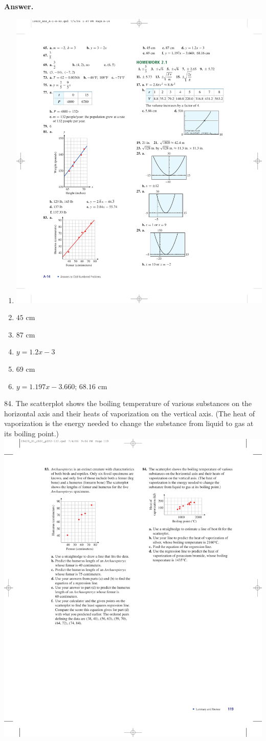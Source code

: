 \documentclass[10pt,]{book}
\theoremstyle{plain}
\theoremstyle{definition}
\theoremstyle{definition}
\theoremstyle{definition}
\theoremstyle{definition}
\numberwithin{equation}{part}
\begin{document}
\begin{exerciselist}
\noindent\textbf{Answer.}\hypertarget{answer-264}{}\quad
\leavevmode%
\begin{multicols}{2}
\begin{enumerate}[label=*\alph**]
\item\hypertarget{li-1686}{}\includegraphics[width=0.8\linewidth]{images/fig-ans-chap1-rev-83}
%
\item\hypertarget{li-1687}{}\(45\) cm%
\item\hypertarget{li-1688}{}\(87\) cm%
\item\hypertarget{li-1689}{}\(y = 1.2x - 3\)%
\item\hypertarget{li-1690}{}\(69\) cm%
\item\hypertarget{li-1691}{}\(y = 1.197x - 3.660\); \(68.16\) cm%
\end{enumerate}
\end{multicols}
%
\item[84.]\hypertarget{exercise-480}{}The scatterplot shows the boiling temperature of various substances on the horizontal axis and their heats of vaporization on the vertical axis. (The heat of vaporization is the energy needed to change the substance from liquid to gas at its boiling point.) \includegraphics[width=0.45\linewidth]{images/fig-chap1-rev-84}

\end{exerciselist}
\end{document}
